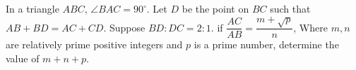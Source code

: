 In a triangle $ABC$, $\angle BAC = 90^{\circ}$. Let $D$ be the point on $BC$ such that $AB + BD = AC + CD$. Suppose $BD : DC = 2:1$. if $\dfrac{AC}{AB} = \dfrac{m + \sqrt{p}}{n}$, Where $m,n$ are relatively prime positive integers and $p$ is a prime number, determine the value of $m+n+p$.
